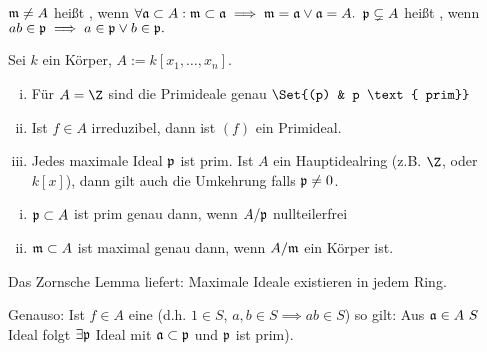 \begin{df}
    $\frak m \neq A$ heißt , wenn
    \begin{math}
        \forall \frak a \subset A: \frak m \subset \frak a \implies \frak m = \frak a \lor \frak a = A.
    \end{math}
    $\frak p \subsetneq A$ heißt , wenn
    \begin{math}
        ab \in \frak p \implies a \in \frak p \lor b \in \frak p.
    \end{math}
\end{df}

\begin{ex}
    Sei $k$ ein Körper, $A := k[x_1, \dotsc, x_n]$.
    \begin{enumerate}[i)]
        \item
            Für $A = \Z$ sind die Primideale genau
            \begin{math}
                \Set{(p) & p \text{ prim}}
            \end{math}
        \item
            Ist $f \in A$ irreduzibel, dann ist $(f)$ ein Primideal.
        \item
            Jedes maximale Ideal $\frak p$ ist prim.
            Ist $A$ ein Hauptidealring (z.B. $\Z$, oder $k[x]$), dann gilt auch die Umkehrung falls $\frak p \neq 0$.
    \end{enumerate}
\end{ex}

\begin{st}
    \begin{enumerate}[i)]
        \item
            $\frak p \subset A$ ist prim genau dann, wenn $A / \frak p$ nullteilerfrei
        \item
            $\frak m \subset A$ ist maximal genau dann, wenn $A / \frak m$ ein Körper ist.
    \end{enumerate}
\end{st}

\begin{nt}
    Das Zornsche Lemma liefert: Maximale Ideale existieren in jedem Ring.

    Genauso: Ist $f \in A$ eine  (d.h. $1 \in S$, $a,b \in S \implies ab \in S$) so gilt:
    Aus $\frak a \in A \ S$ Ideal folgt $\exists \frak p$ Ideal mit $\frak a \subset \frak p$ und $\frak p$ ist prim).
\end{nt}

